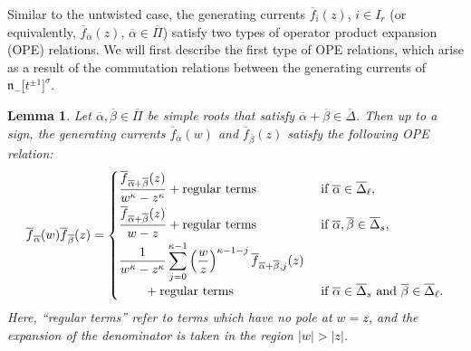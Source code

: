 \documentclass[pdftex]{sigma}
\numberwithin{equation}{section}
\newtheorem{Lemma}[Theorem]{Lemma}
\begin{document}
Similar to the untwisted case, the generating currents $\overline{f}_i(z)$, $i\in I_r$ (or equivalently, $\overline{f}_{\overline{\alpha}}(z)$, $\overline{\alpha}\in \overline{\Pi}$) satisfy two types of operator product expansion (OPE) relations. We will first describe the first type of OPE relations, which arise as a result of the commutation relations between the generating currents of $\mathfrak{n}_-\bigl[t^{\pm1}\bigr]^{\sigma}$.

\begin{Lemma}\label{3.2}
Let $\overline{\alpha},\overline{\beta}\in\overline{\Pi}$ be simple roots that satisfy $\overline{\alpha}+\overline{\beta} \in\overline{\Delta}$. Then up to a sign, the generating currents $\overline{f}_{\overline{\alpha}}(w)$ and $\overline{f}_{\overline{\beta}}(z)$ satisfy the following OPE relation:
\begin{gather}
\overline{f}_{\overline{\alpha}}(w) \overline{f}_{\overline{\beta}}(z)=
\begin{cases}
\dfrac{\overline{f}_{\overline{\alpha}+\overline{\beta}}(z)}{w^{\kappa}-z^{\kappa}}+\text{regular terms} & \text{ if }\overline{\alpha}\in \overline{\Delta}_{\ell},\vspace{1mm}\\
\dfrac{\overline{f}_{\overline{\alpha}+\overline{\beta}}(z)}{w-z}+\text{regular terms} & \text{ if } \overline{\alpha},\overline{\beta}\in\overline{\Delta}_s,\vspace{1mm}\\
\displaystyle \dfrac{1}{w^{\kappa}-z^{\kappa}}\sum_{j=0}^{\kappa-1}\left(\frac{w}{z}\right)^{\kappa-1-j} \overline{f}_{\overline{\alpha}
+\overline{\beta},j}(z)&\\
\qquad {}+\text{regular terms} & \text{ if }\overline{\alpha}\in \overline{\Delta}_s\text{ and }\overline{\beta}\in \overline{\Delta}_{\ell}.
\end{cases}\label{eq:3.12}
\end{gather}
Here, ``regular terms'' refer to terms which have no pole at $w=z$, and the expansion of the denominator is taken in the region $|w|>|z|$.
\end{Lemma}
\end{document}
